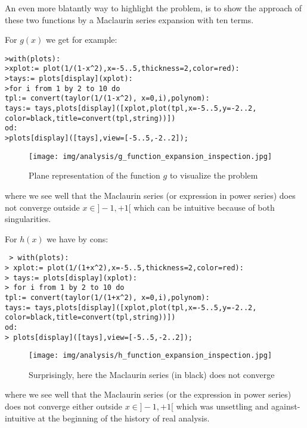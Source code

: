 	An even more blatantly way to highlight the problem, is to show the approach of these two functions by a Maclaurin series expansion with ten terms.
	
	For $g(x)$ we get for example:
	
	\texttt{>with(plots):\\
	>xplot:= plot(1/(1-x\string^2),x=-5..5,thickness=2,color=red):\\
	>tays:= plots[display](xplot):\\
	>for i from 1 by 2 to 10 do\\
		tpl:= convert(taylor(1/(1-x\string^2), x=0,i),polynom):\\
		tays:= tays,plots[display]([xplot,plot(tpl,x=-5..5,y=-2..2,\\
		color=black,title=convert(tpl,string))])\\
		od:\\
	>plots[display]([tays],view=[-5..5,-2..2]);}
	
	\begin{figure}[H]
		\begin{center}
			\texttt{[image: img/analysis/g\_function\_expansion\_inspection.jpg]}
		\end{center}	
		\caption[]{Plane representation of the function $g$ to visualize the problem}
	\end{figure}
	where we see well that the Maclaurin series (or expression in power series) does not converge outside $x \in ]-1,+1[$ which can be intuitive because of both singularities.
	
	For $h(x)$ we have by cons:
	
	\texttt{
	> with(plots):\\
	> xplot:= plot(1/(1+x\string^2),x=-5..5,thickness=2,color=red):\\
	> tays:= plots[display](xplot):\\
	> for i from 1 by 2 to 10 do\\
		tpl:= convert(taylor(1/(1+x\string^2), x=0,i),polynom):\\
		tays:= tays,plots[display]([xplot,plot(tpl,x=-5..5,y=-2..2,\\
		color=black,title=convert(tpl,string))])\\
	od:\\
	> plots[display]([tays],view=[-5..5,-2..2]);\\
	}
	
	\begin{figure}[H]
		\begin{center}
			\texttt{[image: img/analysis/h\_function\_expansion\_inspection.jpg]}
		\end{center}	
		\caption[Divergent Maclaurin series]{Surprisingly, here the Maclaurin series (in black) does not converge}
	\end{figure}
	where we see well that the Maclaurin series (or the expression in power series) does not converge either outside $x \in ]-1,+1[$ which was unsettling and against-intuitive at the beginning of the history of real analysis.
	
